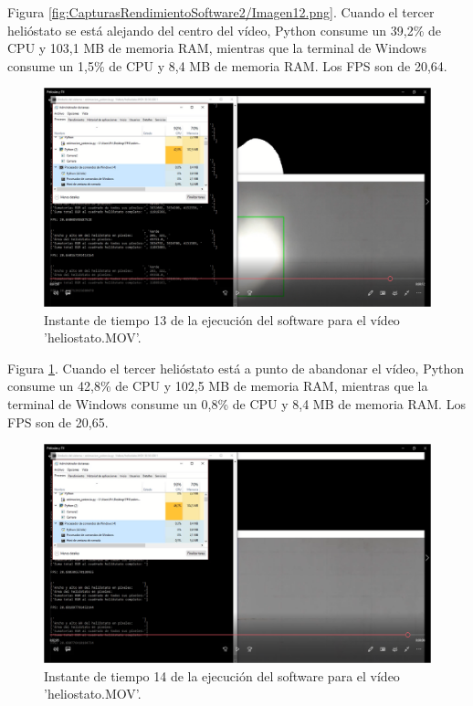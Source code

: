 Figura \ref{fig:CapturasRendimientoSoftware2/Imagen12.png}. Cuando el tercer helióstato se está alejando del centro del vídeo, Python consume un 39,2\% de CPU y 103,1 MB de memoria RAM, mientras que la terminal de Windows consume un 1,5\% de CPU y 8,4 MB de memoria RAM. Los FPS son de 20,64.

\begin{figure}[h!]
  	\centering
	\includegraphics[width=\textwidth]{CapturasRendimientoSoftware2/Imagen13.png}
	\caption{Instante de tiempo 13 de la ejecución del software para el vídeo 'heliostato.MOV'.
	\label{fig:CapturasRendimientoSoftware2/Imagen13.png}}
\end{figure}

Figura \ref{fig:CapturasRendimientoSoftware2/Imagen13.png}. Cuando el tercer helióstato está a punto de abandonar el vídeo, Python consume un 42,8\% de CPU y 102,5 MB de memoria RAM, mientras que la terminal de Windows consume un 0,8\% de CPU y 8,4 MB de memoria RAM. Los FPS son de 20,65.

\begin{figure}[h!]
  	\centering
	\includegraphics[width=\textwidth]{CapturasRendimientoSoftware2/Imagen14.png}
	\caption{Instante de tiempo 14 de la ejecución del software para el vídeo 'heliostato.MOV'.
	\label{fig:CapturasRendimientoSoftware2/Imagen14.png}}
\end{figure}

